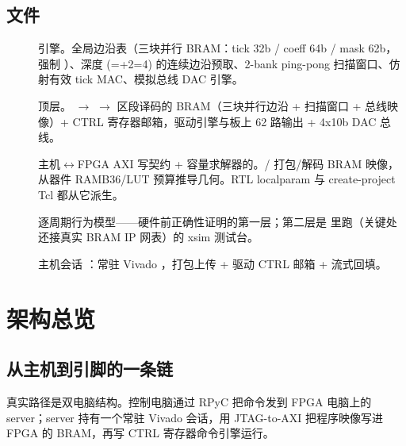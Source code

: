 \documentclass[11pt,oneside,openany]{book}
\begin{document}
\section{文件}
\begin{description}
  \item[] 引擎。全局边沿表（三块并行 BRAM：tick 32b / coeff 64b / mask 62b，强制 ）、深度 (=+2=4) 的连续边沿预取、2-bank ping-pong 扫描窗口、仿射有效 tick MAC、模拟总线 DAC 引擎。
  \item[] 顶层。 $\rightarrow$  $\rightarrow$ 区段译码的 BRAM（三块并行边沿 + 扫描窗口 + 总线映像）+ CTRL 寄存器邮箱，驱动引擎与板上 62 路输出 + 4x10b DAC 总线。
  \item[] 主机$\leftrightarrow$FPGA AXI 写契约 + 容量求解器的。/ 打包/解码 BRAM 映像， 从器件 RAMB36/LUT 预算推导几何。RTL localparam 与 create-project Tcl 都从它派生。
  \item[] 逐周期行为模型——硬件前正确性证明的第一层；第二层是  里跑（关键处还接真实 BRAM IP 网表）的 xsim 测试台。
  \item[] 主机会话 ：常驻 Vivado ，打包上传 + 驱动 CTRL 邮箱 + 流式回填。
\end{description}

\chapter{架构总览}

\section{从主机到引脚的一条链}
真实路径是双电脑结构。控制电脑通过 RPyC 把命令发到 FPGA 电脑上的 server；server 持有一个常驻 Vivado  会话，用 JTAG-to-AXI 把程序映像写进 FPGA 的 BRAM，再写 CTRL 寄存器命令引擎运行。
\end{document}
